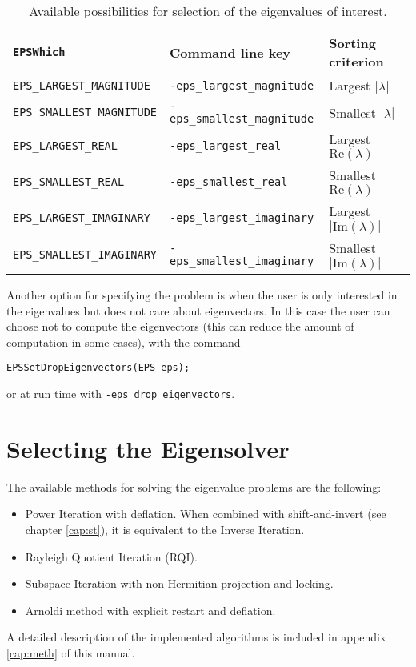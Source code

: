 \begin{table}[t]
\centering
{\small \begin{tabular}{lll}
\texttt{EPSWhich}                  & Command line key                   & Sorting criterion \\\hline
\texttt{EPS\_LARGEST\_MAGNITUDE}   & \texttt{-eps\_largest\_magnitude}  & Largest $|\lambda|$ \\
\texttt{EPS\_SMALLEST\_MAGNITUDE}  & \texttt{-eps\_smallest\_magnitude} & Smallest $|\lambda|$ \\
\texttt{EPS\_LARGEST\_REAL}        & \texttt{-eps\_largest\_real}       & Largest $\mathrm{Re}(\lambda)$ \\
\texttt{EPS\_SMALLEST\_REAL}       & \texttt{-eps\_smallest\_real}      & Smallest $\mathrm{Re}(\lambda)$ \\
\texttt{EPS\_LARGEST\_IMAGINARY}   & \texttt{-eps\_largest\_imaginary}  & Largest $|\mathrm{Im}(\lambda)|$ \\
\texttt{EPS\_SMALLEST\_IMAGINARY}  & \texttt{-eps\_smallest\_imaginary} & Smallest $|\mathrm{Im}(\lambda)|$ \\
\end{tabular} }
\caption{\label{tab:portion}Available possibilities for selection of the eigenvalues of interest.}
\end{table}

	Another option for specifying the problem is when the user is only interested in the eigenvalues but does not care about eigenvectors. In this case the user can choose not to compute the eigenvectors (this can reduce the amount of computation in some cases), with the command
	\begin{Verbatim}[fontsize=\small]
	EPSSetDropEigenvectors(EPS eps);
	\end{Verbatim}
or at run time with \Verb!-eps_drop_eigenvectors!.

\section{Selecting the Eigensolver}

	The available methods for solving the eigenvalue problems are the following:
\begin{itemize}
\item Power Iteration with deflation. When combined with shift-and-invert (see chapter \ref{cap:st}), it is equivalent to the Inverse Iteration.
\item Rayleigh Quotient Iteration (RQI).
\item Subspace Iteration with non-Hermitian projection and locking.
\item Arnoldi method with explicit restart and deflation.
\end{itemize}
A detailed description of the implemented algorithms is included in appendix \ref{cap:meth} of this manual.

